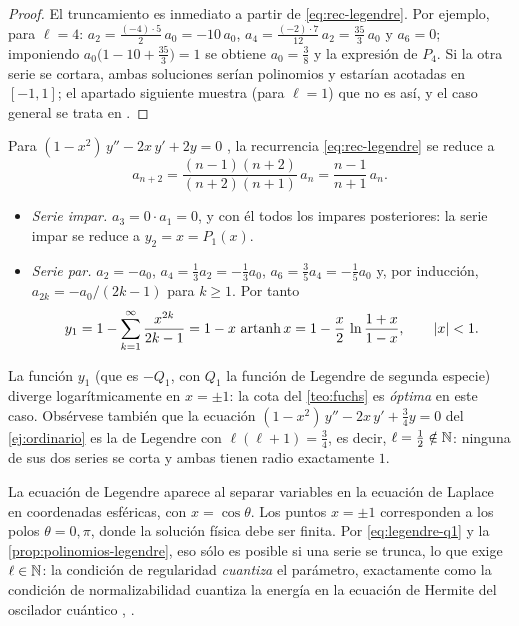 \begin{proof}
El truncamiento es inmediato a partir de \eqref{eq:rec-legendre}. Por
ejemplo, para $\ell=4$: $a_2=\frac{(-4)\cdot5}{2}\,a_0=-10\,a_0$,
$a_4=\frac{(-2)\cdot7}{12}\,a_2=\frac{35}{3}\,a_0$ y $a_6=0$; imponiendo
$a_0\bigl(1-10+\frac{35}3\bigr)=1$ se obtiene $a_0=\frac38$ y la expresión
de $P_4$. Si la otra serie se cortara, ambas soluciones serían polinomios y
estarían acotadas en $[-1,1]$; el apartado siguiente muestra (para $\ell=1$)
que no es así, y el caso general se trata en \cite[§15.6]{ARFKEN}.
\end{proof}



\begin{ejemplo}[Legendre con $\ell=1$]\label{ej:legendre-1}
Para $(1-x^{2})\,y''-2x\,y'+2y=0$ \cite{TEMAV}, la recurrencia
\eqref{eq:rec-legendre} se reduce a
\begin{equation}\label{eq:rec-legendre-1}
  a_{n+2}=\frac{(n-1)(n+2)}{(n+2)(n+1)}\,a_n=\frac{n-1}{n+1}\,a_n .
\end{equation}
\begin{itemize}
  \item \emph{Serie impar.} $a_3=0\cdot a_1=0$, y con él todos los impares
        posteriores: la serie impar se reduce a $y_2=x=P_1(x)$.
  \item \emph{Serie par.} $a_2=-a_0$, $a_4=\tfrac13a_2=-\tfrac13a_0$,
        $a_6=\tfrac35a_4=-\tfrac15a_0$ y, por inducción,
        $a_{2k}=-a_0/(2k-1)$ para $k\ge1$. Por tanto
        \begin{equation}\label{eq:legendre-q1}
          y_1=1-\sum_{k=1}^{\infty}\frac{x^{2k}}{2k-1}
             =1-x\,\operatorname{artanh} x
             =1-\frac{x}{2}\,\ln\frac{1+x}{1-x},\qquad\lvert x\rvert<1 .
        \end{equation}
\end{itemize}
La función $y_1$ (que es $-Q_1$, con $Q_1$ la función de Legendre de segunda
especie) diverge logarítmicamente en $x=\pm1$: la cota del \cref{teo:fuchs}
es \emph{óptima} en este caso. Obsérvese también que la ecuación
$(1-x^{2})\,y''-2x\,y'+\tfrac34y=0$ del \cref{ej:ordinario} es la de Legendre
con $\ell(\ell+1)=\tfrac34$, es decir, $\ell=\tfrac12\notin\mathbb{N}$: ninguna de sus
dos series se corta y ambas tienen radio exactamente $1$.
\end{ejemplo}

\begin{observacion}\label{obs:legendre-fisica}
La ecuación de Legendre aparece al separar variables en la ecuación de
Laplace en coordenadas esféricas, con $x=\cos\theta$. Los puntos $x=\pm1$
corresponden a los polos $\theta=0,\pi$, donde la solución física debe ser
finita. Por \eqref{eq:legendre-q1} y la \cref{prop:polinomios-legendre}, eso
sólo es posible si una serie se trunca, lo que exige $\ell\in\mathbb{N}$: la
condición de regularidad \emph{cuantiza} el parámetro, exactamente como la
condición de normalizabilidad cuantiza la energía en la ecuación de Hermite
del oscilador cuántico \cite{TEMAV}, \cite[§13.1]{ARFKEN}.
\end{observacion}
